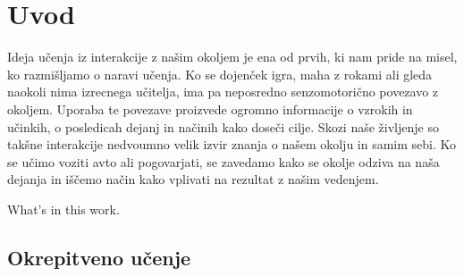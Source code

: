 \documentclass[a4paper, oneside, 12pt]{article}
\begin{document}
\listoftables
\newpage

\listoffigures
\newpage



\section{Uvod}
Ideja učenja iz interakcije z našim okoljem je ena od prvih, ki nam pride na misel, ko razmišljamo o naravi učenja. Ko se dojenček igra, maha z rokami ali gleda naokoli nima izrecnega učitelja, ima pa neposredno senzomotorično povezavo z okoljem. Uporaba te povezave proizvede ogromno informacije o vzrokih in učinkih, o posledicah dejanj in načinih kako doseči cilje. Skozi naše življenje so takšne interakcije nedvoumno velik izvir znanja o našem okolju in samim sebi. Ko se učimo voziti avto ali pogovarjati, se zavedamo kako se okolje odziva na naša dejanja in iščemo način kako vplivati na rezultat z našim vedenjem. \cite{Intro}


What's in this work.



\subsection{Okrepitveno učenje}
\end{document}
